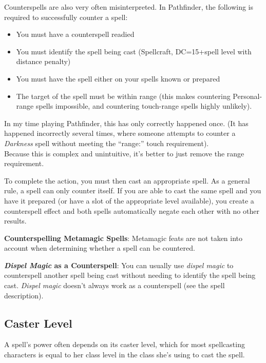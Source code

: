 \begin{formal}
 Counterspells are also very often misinterpreted. In Pathfinder, the following is required to successfully counter a spell:
 \begin{itemize}
  \item You must have a counterspell readied
  \item You must identify the spell being cast (Spellcraft, DC=15+spell level with distance penalty)
  \item You must have the spell either on your spells known or prepared
  \item The target of the spell must be within range (this makes countering Personal-range spells impossible, and countering
      touch-range spells highly unlikely).
 \end{itemize}
 In my time playing Pathfinder, this has only correctly happened once. (It has happened incorrectly several times, where someone
 attempts to counter a \textit{Darkness} spell without meeting the ``range:'' touch requirement). \\
 Because this is complex and unintuitive, it's better to just remove the range requirement.
\end{formal}

To complete the action, you must then cast an appropriate spell. As a general rule, a spell can only counter itself. If you are able
to cast the same spell and you have it prepared (or have a slot of the appropriate level available), you create a 
counterspell effect and both spells automatically negate each other with no other results.

\textbf{Counterspelling Metamagic Spells}: Metamagic feats are not taken into account when determining whether a spell can be countered.

\textbf{\textit{Dispel Magic } as a Counterspell}: You can usually use \textit{dispel magic }to counterspell another spell being cast without needing to identify the spell being cast. \textit{Dispel magic }doesn't always work as a counterspell (see the spell description).
				
\subsection{Caster Level}

				
A spell's power often depends on its caster level, which for most spellcasting characters is equal to her class level in the class she's using to cast the spell. 
				
